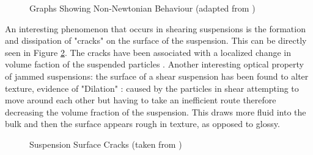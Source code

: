 \documentclass[a4]{report}
\begin{document}
	\begin{figure}[!h]
		\centering
		\label{figshearthinthick}
		\caption{Graphs Showing Non-Newtonian Behaviour (adapted from \cite{figshearthin, figshearthick})}
	\end{figure} \newline  \noindent
	An interesting phenomenon that occurs in shearing suspensions is the formation and dissipation of "cracks" on the surface of the suspension. This can be directly seen in Figure \ref{cforscracks}. The cracks have been associated with a localized change in volume faction of the suspended particles \cite{backhawjam}. Another interesting optical property of jammed suspensions: the surface of a shear suspension has been found to alter texture, evidence of "Dilation" \cite{backbrownjaegrev}: caused by the particles in shear attempting to move around each other but having to take an inefficient route therefore decreasing the volume fraction of the suspension. This draws more fluid into the bulk and then the surface appears rough in texture, as opposed to glossy. 
\newline \newline \noindent
	\begin{figure}[!h]
		\centering
		\caption{Suspension Surface Cracks (taken from \cite[p.~118]{thescforsyth})}
		\label{cforscracks}
	\end{figure} \newline  \noindent
	
\end{document}
